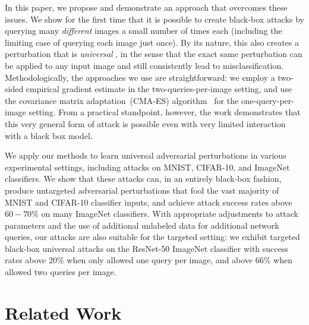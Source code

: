 \documentclass[letterpaper]{article}
\begin{document}
	In this paper, we propose and demonstrate an approach that overcomes these issues.  We show for the first time that it is possible to create black-box attacks by querying many \emph{different} images a small number of times each (including the limiting case of querying each image just once).  By its nature, this also creates a perturbation that is \emph{universal} \cite{moosavi2017universal}, in the sense that the exact same perturbation can be applied to any input image and still consistently lead to misclassification.  Methodologically, the approaches we use are straightforward: we employ a two-sided empirical gradient estimate in the two-queries-per-image setting, and use the covariance matrix adaptation~(CMA-ES) algorithm~\cite{hansen2016cma} for the one-query-per-image setting.  From a practical standpoint, however, the work demonstrates that this very general form of attack is possible even with very limited interaction with a black box model.
	
	
	We apply our methods to learn universal adversarial perturbations in various experimental settings, including attacks on MNIST, CIFAR-10, and ImageNet classifiers. We show that these attacks can, in an entirely black-box fashion, produce untargeted adversarial perturbations that fool the vast majority of MNIST and CIFAR-10 classifier inputs, and achieve attack success rates above $60-70\%$ on many ImageNet classifiers. With appropriate adjustments to attack parameters and the use of additional unlabeled data for additional network queries, our attacks are also suitable for the targeted setting: we exhibit targeted black-box universal attacks on the ResNet-50 ImageNet classifier with success rates above $20\%$ when only allowed one query per image, and above $66\%$ when allowed two queries per image.
	
	\section{Related Work}
	
\end{document}
